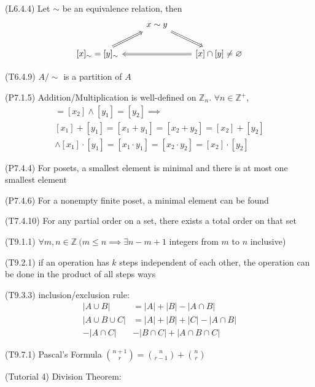 \documentclass[landscape, a4paper]{article}
\let\leq\leqslant
\newcommand{\Z}{\mathbb{Z}}
\renewcommand{\and}{\wedge}
\begin{document}
\begin{multicols*}{4}
\begin{description}[leftmargin=4pt]
        \item (L6.4.4) Let ${\sim}$ be an equivalence relation, then
              \[
                  \begin{tikzcd}
                      & x \sim y \arrow[dr, Rightarrow] &\\
                      {[x]_{\sim}}={[y]_{\sim}} \arrow[ur, Rightarrow] & & \arrow[ll, Rightarrow] [x]\cap[y]\neq\varnothing
                  \end{tikzcd}
              \]
        \item (T6.4.9) $A/{\sim}$ is a partition of $A$
        \item (P7.1.5) Addition/Multiplication is well-defined on $\Z_n$. $\forall n\in\Z^+$,
              \begin{multline*}
                  [x_1]=[x_2] \and [y_1]=[y_2] \implies \\
                  [x_1]+[y_1]=[x_1+y_1]=[x_2+y_2]=[x_2]+[y_2] \\
                  \and [x_1]\cdot [y_1]=[x_1\cdot y_1]=[x_2\cdot y_2]=[x_2]\cdot [y_2]
              \end{multline*}
        \item (P7.4.4) For posets, a smallest element is minimal and there is at most one smallest element
        \item (P7.4.6) For a nonempty finite poset, a minimal element can be found
        \item (T7.4.10) For any partial order on a set, there exists a total order on that set
        \item (T9.1.1) $\forall m,n\in\Z\ (m\leq n\implies \exists n-m+1$ integers from $m$ to $n$ inclusive)
        \item (T9.2.1) if an operation has $k$ steps independent of each other, the operation can be done in the product of all steps ways
        \item (T9.3.3) inclusion/exclusion rule:
              \begin{align*}
                  |A\cup B|       & =|A|+|B|-|A\cap B|           \\
                  |A\cup B\cup C| & =|A|+|B|+|C|-|A\cap B|       \\
                  -|A\cap C|      & -|B\cap C| + |A\cap B\cap C|
              \end{align*}
        \item (T9.7.1) Pascal's Formula $\binom{n+1}{r}=\binom{n}{r-1}+\binom{n}{r}$
        \item (Tutorial 4) Division Theorem:

\end{description}
\end{multicols*}
\end{document}
